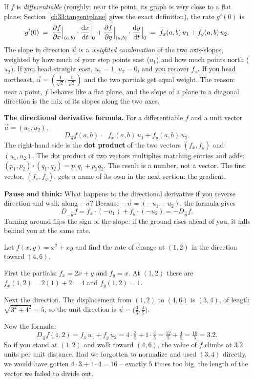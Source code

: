 If $f$ is \emph{differentiable} (roughly: near the point, its graph is very close to
a flat plane; Section~\ref{ch33:tangentplane} gives the exact definition), the rate $g'(0)$ is
\[
  g'(0) \;=\; \frac{\partial f}{\partial x}\Big|_{(a,b)}\cdot \frac{\mathrm{d} x}{\mathrm{d} t}\Big|_{0}
            + \frac{\partial f}{\partial y}\Big|_{(a,b)}\cdot \frac{\mathrm{d} y}{\mathrm{d} t}\Big|_{0}
        \;=\; f_x(a,b)\,u_1 + f_y(a,b)\,u_2.
\]
The slope in direction $\vec u$ is a \emph{weighted
combination} of the two axis-slopes, weighted by how much of your step points east
($u_1$) and how much points north ($u_2$). If you head straight east, $u_1=1$,
$u_2=0$, and you recover $f_x$. If you head northeast,
$\vec u=(\tfrac{1}{\sqrt2},\tfrac{1}{\sqrt2})$ and the two partials get equal
weight. The reason: near a point, $f$ behaves like a flat plane, and the slope of a
plane in a diagonal direction is the mix of its slopes along the two axes.

\begin{focusbox}
\textbf{The directional derivative formula.} For a differentiable $f$ and a unit
vector $\vec u=(u_1,u_2)$,
\[
  \boxed{\,D_{\vec u} f(a,b) = f_x(a,b)\,u_1 + f_y(a,b)\,u_2.\,}
\]
The right-hand side is the \textbf{dot product} of the two vectors $(f_x,f_y)$
and $(u_1,u_2)$. The dot product of two vectors multiplies matching entries and
adds: $(p_1,p_2)\cdot(q_1,q_2)=p_1q_1+p_2q_2$. The result is a number, not a
vector. The first vector, $(f_x,f_y)$, gets a name of its own in the next
section: the gradient.
\end{focusbox}

\textbf{Pause and think:} What happens to the directional derivative if you reverse direction and walk along $-\vec u$? Because $-\vec u = (-u_1, -u_2)$, the formula gives
\[
  D_{-\vec u} f = f_x\cdot(-u_1) + f_y\cdot(-u_2) = -D_{\vec u} f.
\]
Turning around flips the sign of the slope: if the ground rises ahead of you, it falls behind you at the same rate.

\begin{example}
\label{ch33:ex-first}
Let $f(x,y)=x^2 + xy$ and find the rate of change at $(1,2)$ in the direction
toward $(4,6)$.

First the partials: $f_x = 2x + y$ and $f_y = x$. At $(1,2)$ these are
$f_x(1,2)=2(1)+2=4$ and $f_y(1,2)=1$.

Next the direction. The displacement from $(1,2)$ to $(4,6)$ is $(3,4)$, of length
$\sqrt{3^2+4^2}=5$, so the unit direction is $\vec u=\big(\tfrac35,\tfrac45\big)$.

Now the formula:
\[
  D_{\vec u} f(1,2) = f_x\,u_1 + f_y\,u_2
  = 4\cdot\tfrac35 + 1\cdot\tfrac45 = \tfrac{12}{5}+\tfrac45 = \tfrac{16}{5}=3.2.
\]
So if you stand at $(1,2)$ and walk toward $(4,6)$, the value of $f$ climbs at
$3.2$ units per unit distance. Had we forgotten to normalize and used $(3,4)$
directly, we would have gotten $4\cdot 3 + 1\cdot 4 = 16$ -- exactly $5$ times too
big, the length of the vector we failed to divide out.
\end{example}

